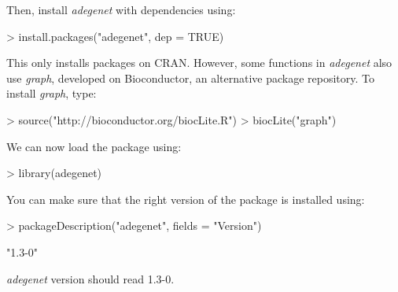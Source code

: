 \documentclass{article}
\begin{document}
Then, install \textit{adegenet} with dependencies using:
\begin{Schunk}
\begin{Sinput}
> install.packages("adegenet", dep = TRUE)
\end{Sinput}
\end{Schunk}
This only installs packages on CRAN.
However, some functions in \textit{adegenet} also use \textit{graph}, developed on Bioconductor, an
alternative package repository.
To install \textit{graph}, type:
\begin{Schunk}
\begin{Sinput}
> source("http://bioconductor.org/biocLite.R")
> biocLite("graph")
\end{Sinput}
\end{Schunk}

We can now load the package using:
\begin{Schunk}
\begin{Sinput}
> library(adegenet)
\end{Sinput}
\end{Schunk}

\noindent You can make sure that the right version of the package is installed using:
\begin{Schunk}
\begin{Sinput}
> packageDescription("adegenet", fields = "Version")
\end{Sinput}
\begin{Soutput}
[1] "1.3-0"
\end{Soutput}
\end{Schunk}
\textit{adegenet} version should read 1.3-0.




\end{document}
